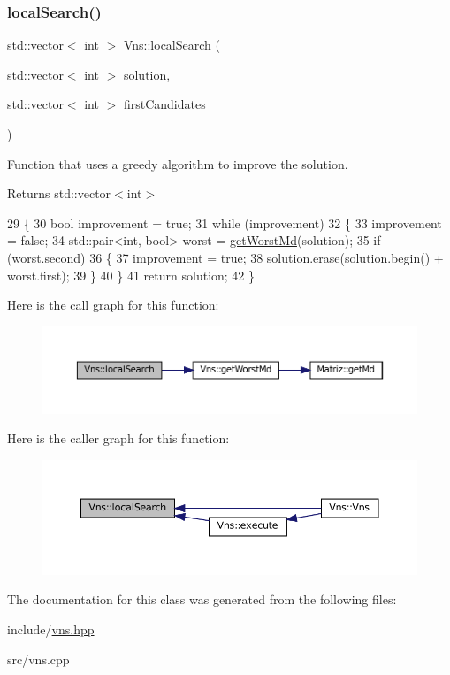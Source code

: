 \subsubsection{\texorpdfstring{local\+Search()}{localSearch()}}
{\footnotesize\ttfamily std\+::vector$<$ int $>$ Vns\+::local\+Search (\begin{DoxyParamCaption}\item[{std\+::vector$<$ int $>$}]{solution,  }\item[{std\+::vector$<$ int $>$}]{first\+Candidates }\end{DoxyParamCaption})}



Function that uses a greedy algorithm to improve the solution. 

\begin{DoxyReturn}{Returns}
std\+::vector$<$int$>$ 
\end{DoxyReturn}

\begin{DoxyCode}
29 \{
30   \textcolor{keywordtype}{bool} improvement = \textcolor{keyword}{true};
31   \textcolor{keywordflow}{while} (improvement)
32   \{
33     improvement = \textcolor{keyword}{false};
34     std::pair<int, bool> worst = \hyperlink{classVns_a2349cd809a0925058a35dea1722c7c23}{getWorstMd}(solution);
35     \textcolor{keywordflow}{if} (worst.second)
36     \{
37       improvement = \textcolor{keyword}{true};
38       solution.erase(solution.begin() + worst.first);
39     \}
40   \}
41   \textcolor{keywordflow}{return} solution;
42 \}
\end{DoxyCode}
Here is the call graph for this function\+:
\nopagebreak
\begin{figure}[H]
\begin{center}
\leavevmode
\includegraphics[width=350pt]{classVns_aea2dfebed6019c61f7b7405e198d50ab_cgraph}
\end{center}
\end{figure}
Here is the caller graph for this function\+:
\nopagebreak
\begin{figure}[H]
\begin{center}
\leavevmode
\includegraphics[width=350pt]{classVns_aea2dfebed6019c61f7b7405e198d50ab_icgraph}
\end{center}
\end{figure}


The documentation for this class was generated from the following files\+:\begin{DoxyCompactItemize}
\item 
include/\hyperlink{vns_8hpp}{vns.\+hpp}\item 
src/vns.\+cpp\end{DoxyCompactItemize}
